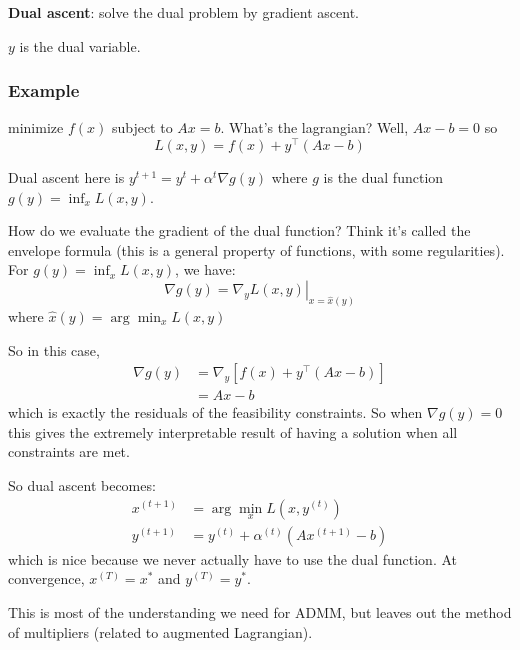 \documentclass{article}
\begin{document}
{\textbf{Dual ascent}}: solve the dual problem by gradient ascent.

$y$ is the dual variable.
\subsubsection{Example}
minimize $f(x)$ subject to $Ax=b$. What's the lagrangian? Well, $Ax-b=0$ so
$$L(x, y)=f(x)+y^\top (Ax-b)$$

Dual ascent here is $y^{t+1}=y^t + \alpha^t \nabla g(y)$ where $g$ is the dual function $g(y)=\inf_x L(x, y)$.

How do we evaluate the gradient of the dual function? Think it's called the envelope formula (this is a general property of functions, with some regularities). For $g(y)=\inf_x L(x, y)$, we have:
$$\nabla g(y)=\left.\nabla_yL(x,y)\right|_{x=\hat{x}(y)}$$ where $\hat{x}(y)=\arg\min_x L(x, y)$

So in this case,
\begin{align*}
\nabla g(y)&=\nabla_y \left[f(x) + y^\top(Ax-b)\right]\\
&=Ax-b
\end{align*}
which is exactly the residuals of the feasibility constraints. So when $\nabla g(y)=0$ this gives the extremely interpretable result of having a solution when all constraints are met.

So dual ascent becomes:
\begin{align*}
x^{(t+1)}&=\arg\min_x L(x, y^{(t)})\\
y^{(t+1)}&=y^{(t)} + \alpha^{(t)} \left(Ax^{(t+1)}-b\right)
\end{align*}
which is nice because we never actually have to use the dual function. At convergence, $x^{(T)}=x^*$ and $y^{(T)}=y^*$.

This is most of the understanding we need for ADMM, but leaves out the method of multipliers (related to augmented Lagrangian).
\end{document}
